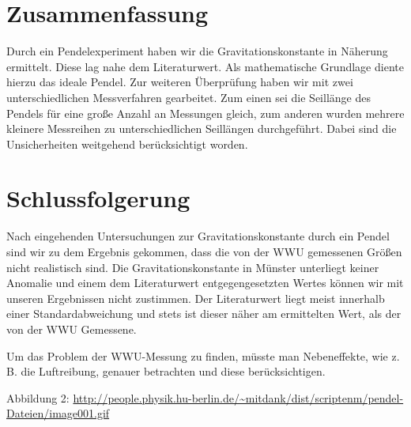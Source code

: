 \documentclass[11pt,a4paper,titlepage, ngerman]{article}
\begin{document}
	\section{Zusammenfassung}
		Durch ein Pendelexperiment haben wir die Gravitationskonstante in Näherung ermittelt.
		Diese lag nahe dem Literaturwert.
		Als mathematische Grundlage diente hierzu das ideale Pendel.
		Zur weiteren Überprüfung haben wir mit zwei unterschiedlichen Messverfahren gearbeitet.
		Zum einen sei die Seillänge des Pendels für eine große Anzahl an Messungen gleich, zum anderen wurden mehrere kleinere Messreihen zu unterschiedlichen Seillängen durchgeführt.
		Dabei sind die Unsicherheiten weitgehend berücksichtigt worden.
		
		
	\section{Schlussfolgerung}
		Nach eingehenden Untersuchungen zur Gravitationskonstante durch ein Pendel sind wir zu dem Ergebnis gekommen, dass die von der WWU gemessenen Größen nicht realistisch sind.
		Die Gravitationskonstante in Münster unterliegt keiner Anomalie und einem dem Literaturwert entgegengesetzten Wertes können wir mit unseren Ergebnissen nicht zustimmen.
		Der Literaturwert liegt meist innerhalb einer Standardabweichung und stets ist dieser näher am ermittelten Wert, als der von der WWU Gemessene.
		
		Um das Problem der WWU-Messung zu finden, müsste man Nebeneffekte, wie z. B. die Luftreibung, genauer betrachten und diese berücksichtigen.
		
		
		\newpage
		
		\begin{thebibliography}{9}		
			\item[Abbildung 2:] \url{http://people.physik.hu-berlin.de/~mitdank/dist/scriptenm/pendel-Dateien/image001.gif}			
		\end{thebibliography}	
			
\end{document}
